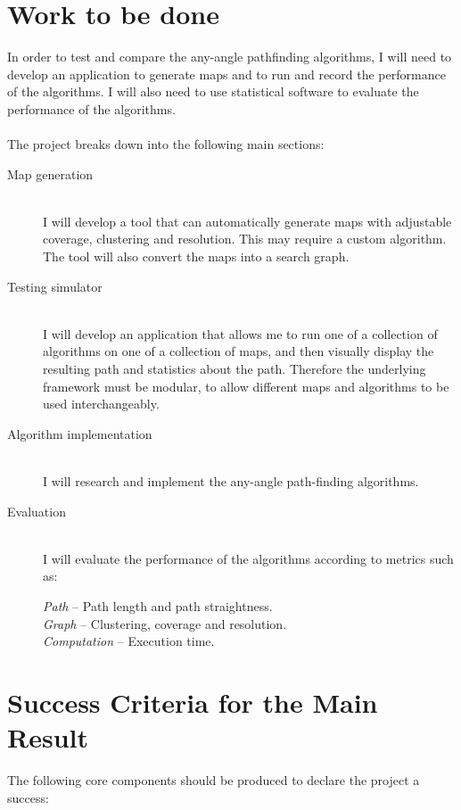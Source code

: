 \section*{Work to be done}

In order to test and compare the any-angle pathfinding algorithms, I will need to develop an application to generate maps and to run and record the performance of the algorithms. I will also need to use statistical software to evaluate the performance of the algorithms.\\ \\ The project breaks down into the following main sections:


\begin{description}
  \item[Map generation] \hfill \\
  I will develop a tool that can automatically generate maps with adjustable coverage, clustering and resolution. This may require a custom algorithm. The tool will also convert the maps into a search graph.
  \item[Testing simulator] \hfill \\
  I will develop an application that allows me to run one of a collection of algorithms on one of a collection of maps, and then visually display the resulting path and statistics about the path. Therefore the underlying framework must be modular, to allow different maps and algorithms to be used interchangeably.
  \item[Algorithm implementation] \hfill \\
  I will research and implement the any-angle path-finding algorithms.
  \item[Evaluation] \hfill \\
  I will evaluate the performance of the algorithms according to metrics such as:
  
  {\em Path} -- Path length and path straightness. \\
  {\em Graph} -- Clustering, coverage and resolution.\\
  {\em Computation} -- Execution time.
  
\end{description}

\section*{Success Criteria for the Main Result}

The following core components should be produced to declare the project a \\success:

